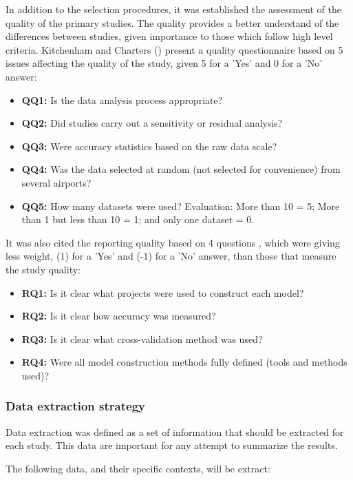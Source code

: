 In addition to the selection procedures, it was established the assessment of the quality of the primary studies. The quality provides a better understand of the differences between studies, given importance to those which follow high level criteria. Kitchenham and Charters (\citeyear{kitchenham2007guidelines}) present a quality questionnaire based on 5 issues affecting the quality of the study, given 5 for a 'Yes' and 0 for a 'No' answer:
    \begin{itemize}
    \item \textbf{QQ1:} Is the data analysis process appropriate?
    \item \textbf{QQ2:} Did studies carry out a sensitivity or residual analysis?
    \item \textbf{QQ3:} Were accuracy statistics based on the raw data scale?
    \item \textbf{QQ4:} Was the data selected at random (not selected for convenience) from several airports?
    \item \textbf{QQ5:} How many datasets were used? Evaluation: More than 10 = 5; More than 1 but less than 10 = 1; and only one dataset = 0.
    \end{itemize}

It was also cited the reporting quality based on 4 questions \cite{kitchenham2007guidelines}, which were giving less weight, (1) for a 'Yes' and (-1) for a 'No' answer, than those that measure the study quality:
    \begin{itemize}
    \item \textbf{RQ1:} Is it clear what projects were used to construct each model?
    \item \textbf{RQ2:} Is it clear how accuracy was measured?
    \item \textbf{RQ3:} Is it clear what cross-validation method was used?
    \item \textbf{RQ4:} Were all model construction methods fully defined (tools and methods used)?
    \end{itemize}

\subsubsection{Data extraction strategy}

Data extraction was defined as a set of information that should be extracted for each study. This data are important for any attempt to summarize the results. 

The following data, and their specific contexts, will be extract:

